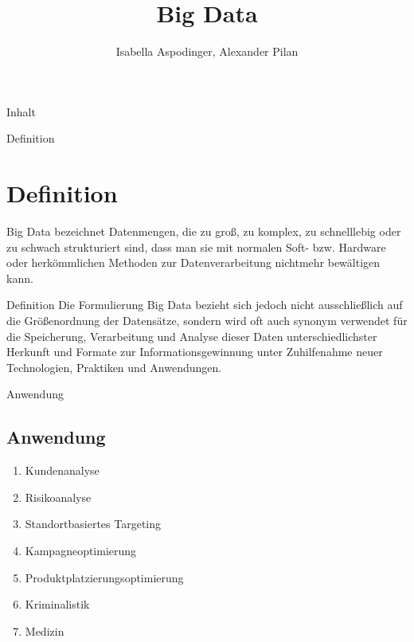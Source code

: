 \documentclass[11pt]{beamer}
\author{Isabella Aspodinger, Alexander Pilan}
\title{Big Data}
\begin{document}
\begin{frame}
\titlepage
\end{frame}

\begin{frame}{Inhalt}
\tableofcontents
\end{frame}

\begin{frame}{Definition}
\section{Definition}

Big Data bezeichnet Datenmengen, die zu groß, zu komplex, zu schnelllebig oder zu schwach strukturiert sind, dass man sie mit normalen Soft- bzw. Hardware oder herkömmlichen Methoden zur Datenverarbeitung nichtmehr bewältigen kann.

\end{frame}

\begin{frame}{Definition}
Die Formulierung Big Data bezieht sich jedoch nicht ausschließlich auf die Größenordnung der Datensätze, sondern wird oft auch synonym verwendet für die Speicherung, Verarbeitung und Analyse dieser Daten unterschiedlichster Herkunft und Formate zur Informationsgewinnung unter Zuhilfenahme neuer Technologien, Praktiken und Anwendungen.

\end{frame}

\begin{frame}{Anwendung}
\subsection{Anwendung}
	\begin{enumerate}
		\item Kundenanalyse
		\item Risikoanalyse
		\item Standortbasiertes Targeting
		\item Kampagneoptimierung
		\item Produktplatzierungsoptimierung
		\item Kriminalistik
		\item Medizin
	\end{enumerate}

\end{frame}
\end{document}
